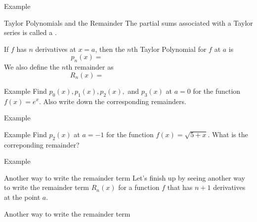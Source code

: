 \documentclass[presentation]{beamer}
\begin{document}
\begin{frame}[label={sec:org1f4785f}]{Example}
\end{frame}

\begin{frame}[label={sec:org5066af6}]{Taylor Polynomials and the Remainder}
The partial sums associated with a Taylor series is called a \uline{\hspace*{1in}}.

\begin{definition}
If \(f\) has \(n\) derivatives at \(x = a\), then the \(n\)th Taylor Polynomial for \(f\) at \(a\)
is
\[
p_n(x) = \hspace{2in}\]
We also define the \(n\)th remainder as
\[
R_n(x) = \hspace{2in}\]
\end{definition}
\end{frame}

\begin{frame}[label={sec:orgd96795b}]{Example}
Find \(p_0(x),p_1(x),p_2(x),\) and \(p_3(x)\) at \(a = 0\) for the
function \(f(x) = e^x.\)  Also write down the corresponding remainders.

\vspace{10in}
\end{frame}

\begin{frame}[label={sec:org1863cf2}]{Example}
\end{frame}

\begin{frame}[label={sec:org88c8445}]{Example}
Find \(p_2(x)\) at \(a = -1\) for the function \(f(x) = \sqrt{5+x}\). What is the correponding remainder?
\vspace{10in}
\end{frame}

\begin{frame}[label={sec:org3595968}]{Example}
\end{frame}

\begin{frame}[label={sec:orgcaff2a7}]{Another way to write the remainder term}
Let's finish up by seeing another way to write the remainder term
\(R_n(x)\) for a function \(f\) that has \(n+1\) derivatives at the
point \(a\).
\vspace{10in}
\end{frame}

\begin{frame}[label={sec:org3548e9d}]{Another way to write the remainder term}
\end{frame}
\end{document}
